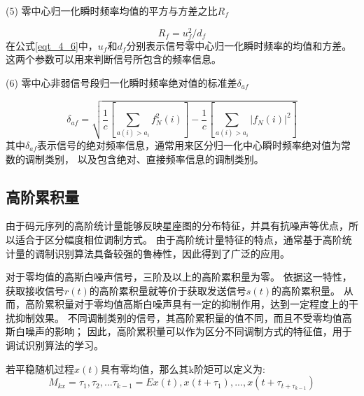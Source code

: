 (5) 零中心归一化瞬时频率均值的平方与方差之比$R_f$\par
\begin{equation}
\label{eqt_4_6}
R_f = u_f^2 / d_f
\end{equation}
在公式\ref{eqt_4_6}中，$u_f$和$d_f$分别表示信号零中心归一化瞬时频率的均值和方差。
这两个参数可以用来判断信号所包含的频率信息。\par

(6) 零中心非弱信号段归一化瞬时频率绝对值的标准差$\delta_{af}$\par
\begin{equation}
\label{eqt_4_7}
\delta_{af} = \sqrt{\frac{1}{c}\left[\sum_{a(i)>a_i} f_N^2(i)\right]
	- \frac{1}{c}\left[\sum_{a(i)>a_i} \left|f_N(i)\right|^2\right]}
\end{equation}
其中$\delta_{af}$表示信号的绝对频率信息，通常用来区分归一化中心瞬时频率绝对值为常数的调制类别，
以及包含绝对、直接频率信息的调制类别。\par

\subsection{高阶累积量}

由于码元序列的高阶统计量能够反映星座图的分布特征，并具有抗噪声等优点，所以适合于区分幅度相位调制方式。
由于高阶统计量特征的特点，通常基于高阶统计量的调制识别算法具备较强的鲁棒性，因此得到了广泛的应用\cite{张利2017基于高阶累积量的调制识别算法的研究}\cite{李世平2011基于小波和高阶累积量的数字调制识别算法}\cite{韩钢2003基于高阶累积量和支撑矢量机的调制识别研究}\cite{基于高阶累积量和循环谱的信号调制方式混合识别算法}\cite{陆凤波2008一种基于高阶累积量的数字调相信号识别方法}。\par

对于零均值的高斯白噪声信号，三阶及以上的高阶累积量为零。
依据这一特性，获取接收信号$r(t)$的高阶累积量就等价于获取发送信号$s(t)$的高阶累积量。
从而，高阶累积量对于零均值高斯白噪声具有一定的抑制作用，达到一定程度上的干扰抑制效果。
不同调制类别的信号，其高阶累积量的值不同，而且不受零均值高斯白噪声的影响；
因此，高阶累积量可以作为区分不同调制方式的特征值，用于调试识别算法的学习。\par

若平稳随机过程$x(t)$具有零均值，那么其k阶矩可以定义为:
\begin{equation}
\label{eqt_4_8}
M_{kx} = \tau_1, \tau_2, ... \tau_{k-1} = E{x(t), x(t+\tau_1), ..., x(t+\tau_{t+\tau_{k-1}})}
\end{equation}

